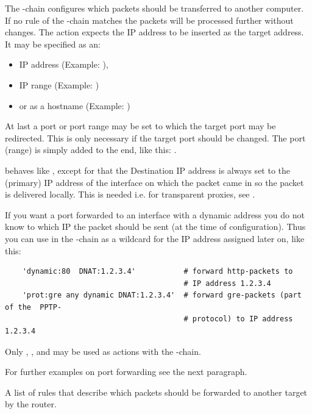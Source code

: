The -chain configures which packets should be transferred
to another computer. If no rule of the -chain matches the
packets will be processed further without changes. The action  expects
the IP address to be inserted as the target address.
It may be specified as an:
\begin{itemize}
\item IP address (Example: ),
\item IP range (Example: )
\item or as a hostname (Example: )
\end{itemize}

At last a port or port range may be set to which the target port may be redirected. 
This is only necessary if the target port should be changed. The port (range) is
simply added to the end, like this:
.

 behaves like , except for that the
Destination IP address is always set to the (primary) IP address of the interface on
which the packet came in so the packet is delivered locally. This
is needed i.e. for transparent proxies, see
.

If you want a port forwarded to an interface with a dynamic address you do not know
to which IP the packet should be sent (at the time of configuration). Thus you can
use  in the -chain as a wildcard for the
IP address assigned later on, like this:

\begin{example}
{\footnotesize
\begin{verbatim}
    'dynamic:80  DNAT:1.2.3.4'           # forward http-packets to
                                         # IP address 1.2.3.4
    'prot:gre any dynamic DNAT:1.2.3.4'  # forward gre-packets (part of the  PPTP-
                                         # protocol) to IP address 1.2.3.4
\end{verbatim}}
\end{example}

Only , ,  and 
may be used as actions with the -chain.

For further examples on port forwarding see the next paragraph.

\begin{description}

\mbox{}\newline
A list of rules that describe which packets should be forwarded to another target by the router.

\end{description}


